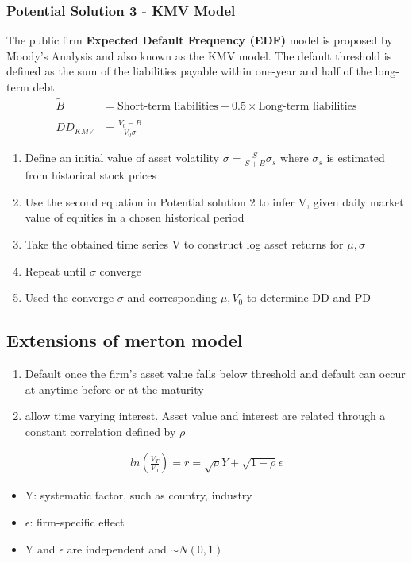 \documentclass{article}
\theoremstyle{definition}
\theoremstyle{thrm}
\theoremstyle{lma}
\theoremstyle{ppst}
\theoremstyle{crlr}
\begin{document}
\subsubsection{Potential Solution 3 -  KMV Model}
The public firm \textbf{Expected Default Frequency (EDF) } model is proposed by Moody's Analysis and also known as the KMV model. The default threshold is defined as the sum of the liabilities payable within one-year and half of the long-term debt
\begin{align*}
	\tilde{B} &= \text{Short-term liabilities} + 0.5\times \text{Long-term liabilities}\\
	DD_{KMV} &= \frac{V_0 - \tilde{B}}{V_0\sigma}
\end{align*}
\begin{enumerate}
	\item Define an initial value of asset volatility $\sigma = \frac{S}{S+B}\sigma_s$ where $\sigma_s$ is estimated from historical stock prices
	\item Use the second equation in Potential solution 2 to infer V, given daily market value of equities in a chosen historical period
	\item Take the obtained time series V to construct log asset returns for $\mu, \sigma$
	\item Repeat until $\sigma$ converge
	\item Used the converge $\sigma$ and corresponding $\mu, V_0$ to determine DD and PD 
\end{enumerate}
\subsection{Extensions of merton model}
\begin{enumerate}
	\item Default once the firm's asset value falls below threshold and default can occur at anytime before or at the maturity
	\item allow time varying interest. Asset value and interest are related through a constant correlation defined by $\rho$
\end{enumerate}

\begin{align*}
	ln(\frac{V_T}{V_0}) = r = \sqrt{\rho} Y + \sqrt{1-\rho}\epsilon
\end{align*}

\begin{itemize}
	\item Y: systematic factor, such as country, industry
	\item $\epsilon$: firm-specific effect
	\item Y and $\epsilon$ are independent and $\sim N(0,1)$
\end{itemize}
\end{document}
